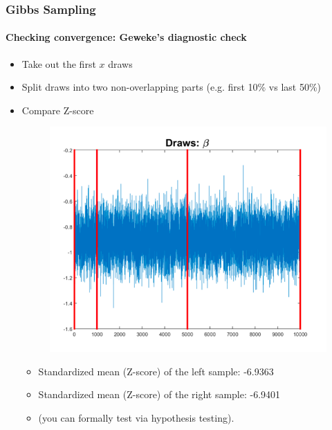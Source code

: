 \documentclass[
  shownotes,
  xcolor={svgnames},
  hyperref={colorlinks,citecolor=DarkBlue,linkcolor=DarkRed,urlcolor=DarkBlue}
  , aspectratio=169]{beamer}
\begin{document}
\begin{frame}[fragile]
\frametitle{Gibbs Sampling} 
\framesubtitle{Checking convergence: Geweke's diagnostic check}
 

\begin{itemize}


\item Take out the first $x$ draws

\item  Split draws into two non-overlapping parts (e.g. first 10\% vs last 50\%)

\item Compare Z-score

\begin{figure}[H] \centering
  \centering
  \includegraphics[scale=0.45]{figures/fig5_gibbs}
  \\
  \tiny 
\end{figure}

  
\begin{itemize}
    \footnotesize
\item Standardized mean (Z-score) of the left sample: -6.9363

\item Standardized mean (Z-score) of the right sample: -6.9401

 \item (you can formally test via hypothesis testing).
 \end{itemize}
\end{itemize}
 \end{frame}
\end{document}
